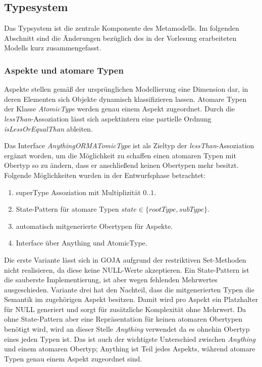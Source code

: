 \subsection{Typesystem}
Das Typsystem ist die zentrale Komponente des Metamodells. Im folgenden Abschnitt sind die 
Änderungen bezüglich des in der Vorlesung erarbeiteten Modells kurz zusammengefasst.

\subsubsection{Aspekte und atomare Typen}

Aspekte stellen gemäß der ursprünglichen Modellierung eine Dimension dar, in deren Elementen sich Objekte dynamisch klassifizieren lassen. 
Atomare Typen der Klasse \emph{AtomicType} werden genau einem Aspekt zugeordnet. Durch die \emph{lessThan}-Assoziation lässt sich aspektintern eine 
partielle Ordnung \emph{isLessOrEqualThan} ableiten.  


Das Interface \emph{AnythingORMATomicType} ist als Zieltyp der \emph{lessThan}-Assoziation ergänzt worden, 
um die Möglichkeit zu schaffen einen atomaren Typen mit Obertyp so zu ändern, dass er anschließend keinen 
Obertypen mehr besitzt. Folgende Möglichkeiten wurden in der Entwurfsphase betrachtet: 
\begin{enumerate}
  		\item superType Assoziation mit Multiplizität $0..1$.
		\item State-Pattern für atomare Typen \(state \in \{rootType, subType\}\).
        \item automatisch mitgenerierte Obertypen für Aspekte.
        \item Interface über Anything und AtomicType.
\end{enumerate}

Die erste Variante lässt sich in GOJA aufgrund der restriktiven Set-Methoden nicht realisieren, da diese keine NULL-Werte akzeptieren.
Ein State-Pattern ist die sauberste Implementierung, ist aber wegen fehlenden Mehrwertes ausgeschieden. 
Variante drei hat den Nachteil, dass die mitgenerierten Typen die Semantik  im zugehörigen Aspekt besitzen.
Damit wird pro Aspekt ein Platzhalter für NULL generiert und sorgt für zusätzliche Komplexität ohne Mehrwert. 
Da ohne State-Pattern aber eine Repräsentation für keinen atomaren Obertypen benötigt wird, wird an dieser Stelle \emph{Anything} verwendet 
da es ohnehin Obertyp eines jeden Typen ist. Das ist auch der wichtigste Unterschied zwischen \emph{Anything} und einem atomaren Obertyp; Anything ist Teil jedes Aspekts, 
während atomare Typen genau einem Aspekt zugeordnet sind. 


